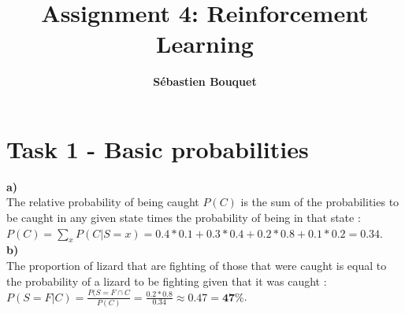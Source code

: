 \documentclass[11pt]{article}
\title{Assignment 4: Reinforcement Learning}
\author{\textbf{Sébastien Bouquet}}
\date{}
\begin{document}
\maketitle
\section{Task 1 - Basic probabilities}
\textbf{a)} \\
The relative probability of being caught $P(C)$ is the sum of the probabilities to be caught in any given state times the probability of being in that state : \linebreak 
$P(C) = \sum_x P(C | S=x) = 0.4*0.1 + 0.3*0.4 + 0.2*0.8 + 0.1*0.2 = \mathbf{0.34}$. \\

\textbf{b)} \\
The proportion of lizard that are fighting of those that were caught is equal to the probability of a lizard to be fighting given that it was caught : \\
$P(S=F | C) = \frac{P(S=F \cap C}{P(C)} = \frac{0.2*0.8}{0.34} \approx \mathbf{0.47 = 47\%}$.
\end{document}
